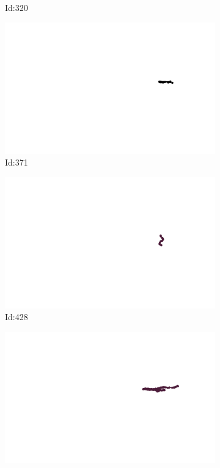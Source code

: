 \documentclass[12pt,twoside]{report}
\begin{document}
\begin{figure}
\begin{subfigure}[b]{0.20\textwidth}
\caption{Id:320}
\end{subfigure}
\begin{subfigure}[b]{0.20\textwidth}
\centering
\includegraphics[width=\textwidth]{../../trajectories/371.png}
\caption{Id:371}
\end{subfigure}
\begin{subfigure}[b]{0.20\textwidth}
\centering
\includegraphics[width=\textwidth]{../../trajectories/428.png}
\caption{Id:428}
\end{subfigure}
\begin{subfigure}[b]{0.20\textwidth}
\centering
\includegraphics[width=\textwidth]{../../trajectories/585.png}

\end{subfigure}
\end{figure}
\end{document}
